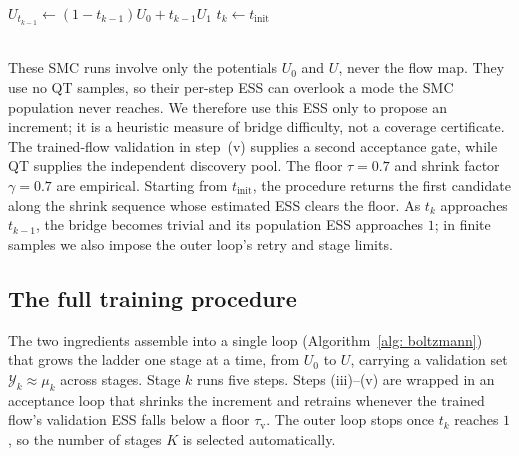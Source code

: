 \documentclass{article}
\begin{document}
\begin{algorithm}[htb]
\caption{Adaptive selection of the temperature step $\Delta t_k$}
\label{alg: step}

$U_{t_{k-1}} \gets (1-t_{k-1}) U_0 + t_{k-1} U_1$\;
$t_k \gets t_{\mathrm{init}}$\;
\end{algorithm}
\mbox{}\\
These SMC runs involve only the potentials $U_0$ and $U$, never the flow map. They use no QT samples, so their per-step ESS can overlook a mode the SMC population never reaches. We therefore use this ESS only to propose an increment; it is a heuristic measure of bridge difficulty, not a coverage certificate. The trained-flow validation in step~(v) supplies a second acceptance gate, while QT supplies the independent discovery pool. The floor $\tau = 0.7$ and shrink factor $\gamma = 0.7$ are empirical. Starting from $t_{\mathrm{init}}$, the procedure returns the first candidate along the shrink sequence whose estimated ESS clears the floor. As $t_k$ approaches $t_{k-1}$, the bridge becomes trivial and its population ESS approaches $1$; in finite samples we also impose the outer loop's retry and stage limits.

\subsection{The full training procedure}

The two ingredients assemble into a single loop (Algorithm~\ref{alg: boltzmann}) that grows the ladder one stage at a time, from $U_0$ to $U$, carrying a validation set $\mathcal Y_k \approx \mu_k$ across stages. Stage $k$ runs five steps. Steps (iii)--(v) are wrapped in an acceptance loop that shrinks the increment and retrains whenever the trained flow's validation ESS falls below a floor $\tau_{\mathrm v}$. The outer loop stops once $t_k$ reaches $1$, so the number of stages $K$ is selected automatically.
\end{document}
